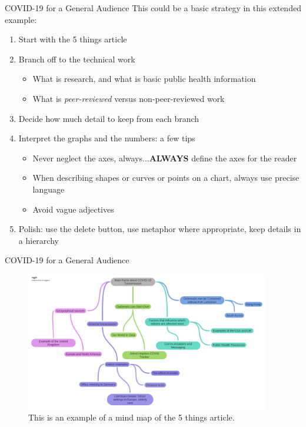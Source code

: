 \documentclass{beamer}
\begin{document}
\begin{frame}{COVID-19 for a General Audience}
This could be a basic strategy in this extended example:
\begin{enumerate}
\item Start with the 5 things article
\item Branch off to the technical work
\begin{itemize}
\item What is research, and what is basic public health information
\item What is \textit{peer-reviewed} versus non-peer-reviewed work
\end{itemize}
\item Decide how much detail to keep from each branch
\item Interpret the graphs and the numbers: a few tips
\begin{itemize}
\item Never neglect the axes, always...\textbf{ALWAYS} define the axes for the reader
\item When describing shapes or curves or points on a chart, always use precise language
\item Avoid vague adjectives
\end{itemize}
\item Polish: use the delete button, use metaphor where appropriate, keep details in a hierarchy
\end{enumerate}
\end{frame}

\begin{frame}{COVID-19 for a General Audience}
\begin{figure}
\includegraphics[width=0.95\textwidth]{figures/COVID_map.pdf}
\caption{\label{fig:covid2} This is an example of a mind map of the 5 things article.}
\end{figure}
\end{frame}
\end{document}
